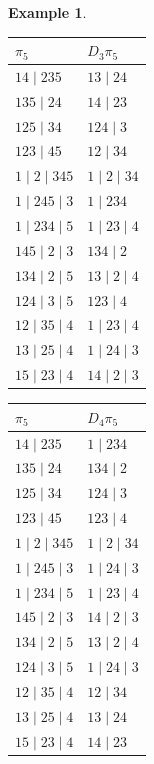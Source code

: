 \documentclass{article}
\newtheorem{example}{Example}
\begin{document}
\begin{example}
{\vspace{0.6cm}
\begin{minipage}[t]{0.31\textwidth}
\centering
\begin{tabular}{l | l}
$\pi_5$ & $D_3\pi_5$ \\
\hline
$14 \mid 235$ & $13 \mid 24$ \\
$135 \mid 24$ & $14 \mid 23$ \\
$125 \mid 34$ & $124 \mid 3$ \\
$123 \mid 45$ & $12 \mid 34$ \\
$1 \mid 2 \mid 345$ & $1 \mid 2 \mid 34$ \\
$1 \mid 245 \mid 3$ & $1 \mid 234$ \\
$1 \mid 234 \mid 5$ & $1 \mid 23 \mid 4$ \\
$145 \mid 2 \mid 3$ & $134 \mid 2$ \\
$134 \mid 2 \mid 5$ & $13 \mid 2 \mid 4$ \\
$124 \mid 3 \mid 5$ & $123 \mid 4$ \\
$12 \mid 35 \mid 4$ & $1 \mid 23 \mid 4$ \\
$13 \mid 25 \mid 4$ & $1 \mid 24 \mid 3$ \\
$15 \mid 23 \mid 4$ & $14 \mid 2 \mid 3$
\end{tabular}
\end{minipage}
\hfill
\begin{minipage}[t]{0.31\textwidth}
\centering
\begin{tabular}{l | l}
$\pi_5$ & $D_4\pi_5$ \\
\hline
$14 \mid 235$ & $1 \mid 234$ \\
$135 \mid 24$ & $134 \mid 2$ \\
$125 \mid 34$ & $124 \mid 3$ \\
$123 \mid 45$ & $123 \mid 4$ \\
$1 \mid 2 \mid 345$ & $1 \mid 2 \mid 34$ \\
$1 \mid 245 \mid 3$ & $1 \mid 24 \mid 3$ \\
$1 \mid 234 \mid 5$ & $1 \mid 23 \mid 4$ \\
$145 \mid 2 \mid 3$ & $14 \mid 2 \mid 3$ \\
$134 \mid 2 \mid 5$ & $13 \mid 2 \mid 4$ \\
$124 \mid 3 \mid 5$ & $1 \mid 24 \mid 3$ \\
$12 \mid 35 \mid 4$ & $12 \mid 34$ \\
$13 \mid 25 \mid 4$ & $13 \mid 24$ \\
$15 \mid 23 \mid 4$ & $14 \mid 23$
\end{tabular}

\end{minipage}}
\end{example}
\end{document}
